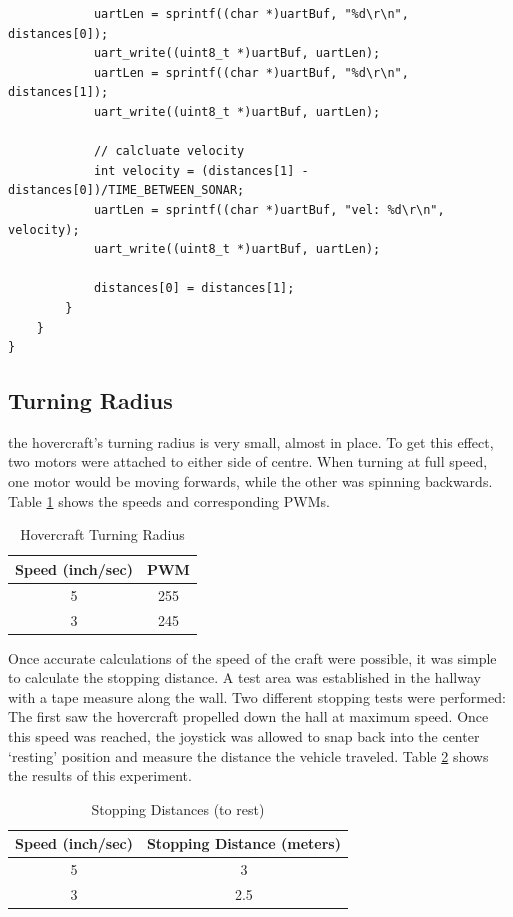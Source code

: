 \begin{lstlisting}
            uartLen = sprintf((char *)uartBuf, "%d\r\n", distances[0]);
            uart_write((uint8_t *)uartBuf, uartLen);
            uartLen = sprintf((char *)uartBuf, "%d\r\n", distances[1]);
            uart_write((uint8_t *)uartBuf, uartLen);

            // calcluate velocity
            int velocity = (distances[1] - distances[0])/TIME_BETWEEN_SONAR;
            uartLen = sprintf((char *)uartBuf, "vel: %d\r\n", velocity);
            uart_write((uint8_t *)uartBuf, uartLen);

            distances[0] = distances[1];
        }
    }
}
\end{lstlisting}

\subsection{Turning Radius}
the hovercraft's turning radius is very small, almost in place. To get this effect, two motors were attached to either side of centre. When turning at full speed, one motor would be moving forwards, while the other was spinning backwards. Table \ref{turningRadius} shows the speeds and corresponding PWMs. 

\begin{table}
\caption{Hovercraft Turning Radius}
\begin{center}
\begin{tabular}{ c c }
  Speed (inch/sec) & PWM \\
  \hline
  5 & 255 \\
  3 & 245 \\
\end{tabular}
\end{center}
\label{turningRadius}
\end{table}

Once accurate calculations of the speed of the craft were possible, it was simple to calculate the stopping distance.  A test area was established in the hallway with a tape measure along the wall.  Two different stopping tests were performed: The first saw the hovercraft propelled down the hall at maximum speed. Once this speed was reached, the joystick was allowed to snap back into the center `resting' position and measure the distance the vehicle traveled. Table \ref{restingTable} shows the results of this experiment.

\begin{table}
\caption{Stopping Distances (to rest)}
\begin{center}
\begin{tabular}{ c c }
  Speed (inch/sec) & Stopping Distance (meters) \\
  \hline
  5 & 3 \\
  3 & 2.5 \\
\end{tabular}
\end{center}
\label{restingTable}
\end{table}

